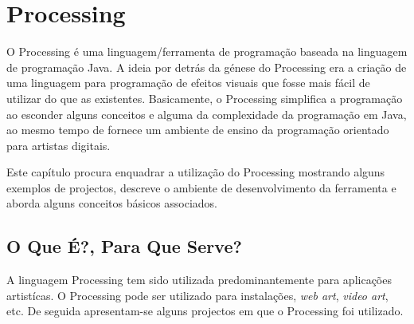\chapter{Processing}
O Processing é uma linguagem/ferramenta de programação baseada na linguagem de programação Java.
A ideia por detrás da génese do Processing era a criação de uma linguagem para programação de efeitos visuais que
fosse mais fácil de utilizar do que as existentes. Basicamente, o Processing simplifica a programação ao esconder alguns conceitos e alguma da complexidade da programação em Java, ao mesmo tempo de fornece um ambiente de ensino da programação orientado para artistas digitais.

Este capítulo procura enquadrar a utilização do Processing mostrando alguns exemplos de projectos, descreve o ambiente de desenvolvimento da ferramenta e aborda alguns conceitos básicos associados.

\section{O Que É?, Para Que Serve?}
A linguagem Processing tem sido utilizada predominantemente para aplicações artistícas. O Processing pode ser utilizado para instalações, \emph{web art}, \emph{video art}, etc. De seguida apresentam-se alguns projectos em que o Processing foi utilizado.


